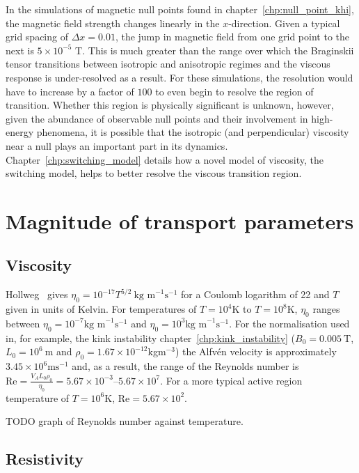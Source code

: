 In the simulations of magnetic null points found in chapter~\ref{chp:null_point_khi}, the magnetic field strength changes linearly in the $x$-direction. Given a typical grid spacing of $\Delta x = 0.01$, the jump in magnetic field from one grid point to the next is $5\times 10^{-5}$ T. This is much greater than the range over which the Braginskii tensor transitions between isotropic and anisotropic regimes and the viscous response is under-resolved as a result. For these simulations, the resolution would have to increase by a factor of $100$ to even begin to resolve the region of transition. Whether this region is physically significant is unknown, however, given the abundance of observable null points and their involvement in high-energy phenomena, it is possible that the isotropic (and perpendicular) viscosity near a null plays an important part in its dynamics. Chapter~\ref{chp:switching_model} details how a novel model of viscosity, the switching model, helps to better resolve the viscous transition region.

\section{Magnitude of transport parameters}

\subsection{Viscosity}

Hollweg~\cite{hollwegViscosityMagnetizedPlasma1985} gives $\eta_0 = 10^{-17} T^{5/2}\ \text{kg m}^{-1} \text{s}^{-1}$ for a Coulomb logarithm of 22 and $T$ given in units of Kelvin. For temperatures of $T=10^4$K to $T=10^8$K, $\eta_0$ ranges between $\eta_0 = 10^{-7} \text{kg m}^{-1} \text{s}^{-1}$ and $\eta_0 = 10^3 \text{kg m}^{-1} \text{s}^{-1}$. For the normalisation used in, for example, the kink instability chapter~\ref{chp:kink_instability} ($B_0 = 0.005\ \text{T}$, $L_0 = 10^6\ \text{m}$ and $\rho_0 = 1.67 \times 10^{-12}$kgm$^{-3}$) the Alfv\'en velocity is approximately $3.45 \times 10^6 \text{ms}^{-1}$ and, as a result, the range of the Reynolds number is $\text{Re} = \frac{V_A L_0 \rho_0}{\eta_0} = 5.67 \times 10^{-3}$--$5.67 \times 10^{7}$. For a more typical active region temperature of $T=10^6 \text{K}$, Re$=5.67 \times 10^2$. 

TODO graph of Reynolds number against temperature.

\subsection{Resistivity}

